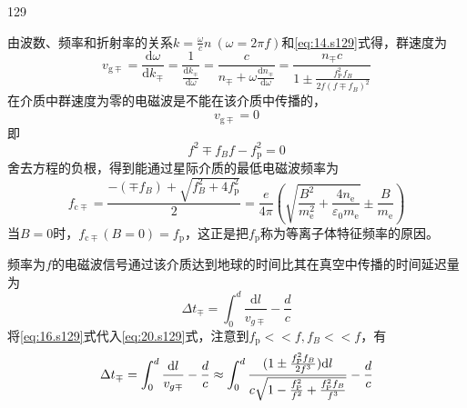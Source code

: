 \begin{solution}{129}
\begin{subsolution}
        由波数、频率和折射率的关系$k = \frac { \omega } { c } n \ ( \omega = 2 \pi f )$和\eqref{eq:14.s129}式得，群速度为
        \begin{equation}
            v _ {\mathrm{g} \mp} = \frac {\mathrm{d} \omega}{\mathrm{d} k _ {\mp}} = \frac {1}{\frac {\mathrm{d} k _ {\mp}}{\mathrm{d} \omega}} = \frac {c}{n _ {\mp} + \omega \frac {\mathrm{d} n _ {\mp}}{\mathrm{d} \omega}} = \frac {n _ {\mp} c}{1 \pm \frac {f _ {\mathrm{P}} ^ {2} f _ {B}}{2 f (f \mp f _ {B}) ^ {2}}}
            \label{eq:16.s129}
        \end{equation}
        在介质中群速度为零的电磁波是不能在该介质中传播的，
        \begin{equation}
            v _ {\mathrm{g} \mp} = 0
            \label{eq:17.s129}
        \end{equation}
        即
        \begin{equation}
            f ^ {2} \mp f _ {B} f - f _ {\mathrm{p}} ^ {2} = 0
            \label{eq:18.s129}
        \end{equation}
        舍去方程的负根，得到能通过星际介质的最低电磁波频率为
        \begin{equation}
            f _ {\mathrm{c} \mp} = \frac {- (\mp f _ {B}) + \sqrt {f _ {B} ^ {2} + 4 f _ {\mathrm{p}} ^ {2}}}{2} = \frac {e}{4 \pi} \left(\sqrt {\frac {B ^ {2}}{m _ {\mathrm{e}} ^ {2}} + \frac {4 n _ {\mathrm{e}}}{\varepsilon_ {0} m _ {\mathrm{e}}}} \pm \frac {B}{m _ {\mathrm{e}}}\right)
            \label{eq:19.s129}
        \end{equation}
        当$B = 0$时，$f _ { \mathrm { c \mp } } ( B = 0 ) = f _ { \mathrm { p } }$，这正是把$f _ { \mathrm { p } }$称为等离子体特征频率的原因。
    \end{subsolution}
    \begin{subsolution}
        频率为$f$的电磁波信号通过该介质达到地球的时间比其在真空中传播的时间延迟量为
        \begin{equation}
            \Delta t _ {\mp} = \int_ {0} ^ {d} \frac {\mathrm{d} l}{v _ {g \mp}} - \frac {d}{c}
            \label{eq:20.s129}
        \end{equation}
        将\eqref{eq:16.s129}式代入\eqref{eq:20.s129}式，注意到$f _ { \mathrm { p } } << f , f _ { B } << f$，有
        \begin{align}
            \Delta t _ {\mp} &= \int_ {0} ^ {d} \frac {\mathrm{d} l}{v _ {g \mp}} - \frac {d}{c} \approx \int_ {0} ^ {d} \frac {(1 \pm \frac {f _ {\mathrm{P}} ^ {2} f _ {B}}{2 f ^ {3}}) \mathrm{d} l}{c \sqrt {1 - \frac {f _ {\mathrm{P}} ^ {2}}{f ^ {2}} + \frac {f _ {\mathrm{P}} ^ {2} f _ {B}}{f ^ {3}}}} - \frac {d}{c} \notag \\

\end{align}
\end{subsolution}
\end{solution}
